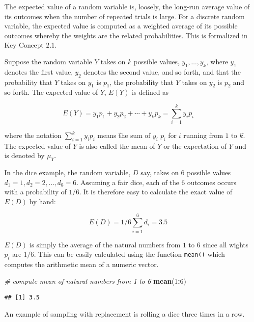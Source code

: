 \documentclass[]{book}
\newenvironment{Shaded}{\begin{snugshade}}{\end{snugshade}}
\newcommand{\KeywordTok}[1]{\textcolor[rgb]{0.13,0.29,0.53}{\textbf{#1}}}
\newcommand{\DecValTok}[1]{\textcolor[rgb]{0.00,0.00,0.81}{#1}}
\newcommand{\CommentTok}[1]{\textcolor[rgb]{0.56,0.35,0.01}{\textit{#1}}}
\newcommand{\OperatorTok}[1]{\textcolor[rgb]{0.81,0.36,0.00}{\textbf{#1}}}
\newcommand{\NormalTok}[1]{#1}
\theoremstyle{definition}
\theoremstyle{definition}
\theoremstyle{definition}
\theoremstyle{remark}
\begin{document}
The expected value of a random variable is, loosely, the long-run
average value of its outcomes when the number of repeated trials is
large. For a discrete random variable, the expected value is computed as
a weighted average of its possible outcomes whereby the weights are the
related probabilities. This is formalized in Key Concept 2.1.

\begin{keyconcepts}{2.1}
Suppose the random variable $Y$
takes on $k$ possible values, $y_1, \dots, y_k$, where $y_1$ denotes the first
value, $y_2$ denotes the second value, and so forth, and that the probability
that $Y$ takes on $y_1$ is $p_1$, the probability that $Y$ takes on $y_2$ is
$p_2$ and so forth. The expected value of $Y$, $E(Y)$ is defined as

$$ E(Y) = y_1 p_1 + y_2 p_2 + \cdots + y_k p_k = \sum_{i=1}^k y_i p_i $$

where the notation $\sum_{i=1}^k y_i p_i$ means \"the sum of $y_i$ $p_i$ for $i$
running from $1$ to $k$\". The expected value of $Y$ is also called the mean of $Y$
or the expectation of $Y$ and is denoted by $\mu_Y$.
\end{keyconcepts}

In the dice example, the random variable, \(D\) say, takes on \(6\)
possible values \(d_1 = 1, d_2 = 2, \dots, d_6 = 6\). Assuming a fair
dice, each of the \(6\) outcomes occurs with a probability of \(1/6\).
It is therefore easy to calculate the exact value of \(E(D)\) by hand:

\[ E(D) = 1/6 \sum_{i=1}^6 d_i = 3.5 \]

\(E(D)\) is simply the average of the natural numbers from \(1\) to
\(6\) since all wights \(p_i\) are \(1/6\). This can be easily
calculated using the function \texttt{mean()} which computes the
arithmetic mean of a numeric vector.

\begin{Shaded}
\begin{Highlighting}[]
\CommentTok{# compute mean of natural numbers from 1 to 6}
\KeywordTok{mean}\NormalTok{(}\DecValTok{1}\OperatorTok{:}\DecValTok{6}\NormalTok{)}
\end{Highlighting}
\end{Shaded}

\begin{verbatim}
## [1] 3.5
\end{verbatim}

An example of sampling with replacement is rolling a dice three times in
a row.
\end{document}
